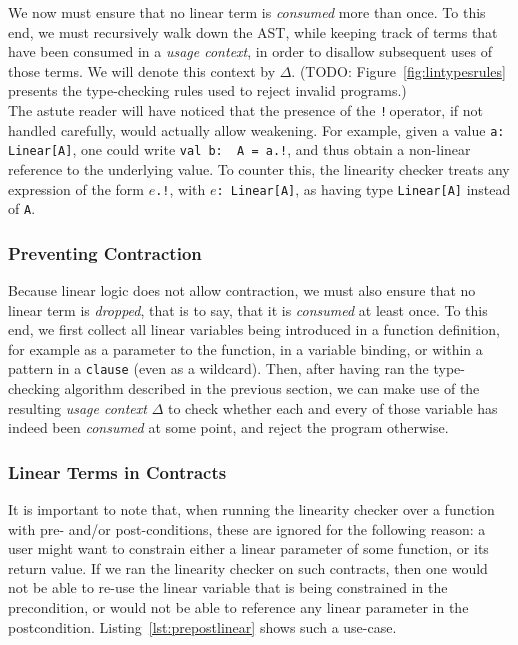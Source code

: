 \documentclass[a4paper,twoside]{article}
\newcommand{\TODO}[1]{\textcolor{YellowOrange}{(TODO: #1)}} %
\newcommand{\RefFig}[1]{Figure~\ref{#1}}
\newcommand{\RefCode}[1]{Listing~\ref{#1}}
\newcommand{\stt}[1]{\texttt{\small{#1}}}
\begin{document}
We now must ensure that no linear term is \textit{consumed} more than once. To this end, we must recursively walk down the AST, while keeping track of terms that have been consumed in a \textit{usage context}, in order to disallow subsequent uses of those terms. We will denote this context by $\Delta$. \TODO{\RefFig{fig:lintypesrules} presents the type-checking rules used to reject invalid programs.}\\

The astute reader will have noticed that the presence of the \stt{!}\,operator, if not handled carefully, would actually allow weakening. For example, given a value \stt{a:\,Linear[A]}, one could write \stt{val b:\, A = a.!}, and thus obtain a non-linear reference to the underlying value. To counter this, the linearity checker treats any expression of the form \stt{$e$.!}, with \stt{$e$:\,Linear[A]}, as having type \stt{Linear[A]} instead of \stt{A}.

\subsubsection*{Preventing Contraction}

Because linear logic does not allow contraction, we must also ensure that no linear term is \textit{dropped}, that is to say, that it is \textit{consumed} at least once. To this end, we first collect all linear variables being introduced in a function definition, for example as a parameter to the function, in a variable binding, or within a pattern in a \texttt{clause} (even as a wildcard). Then, after having ran the type-checking algorithm described in the previous section, we can make use of the resulting \textit{usage context} $\Delta$ to check whether each and every of those variable has indeed been \textit{consumed} at some point, and reject the program otherwise.

\subsubsection*{Linear Terms in Contracts}

It is important to note that, when running the linearity checker over a function with pre- and/or post-conditions, these are ignored for the following reason: a user might want to constrain either a linear parameter of some function, or its return value. If we ran the linearity checker on such contracts, then one would not be able to re-use the linear variable that is being constrained in the precondition, or would not be able to reference any linear parameter in the postcondition. \RefCode{lst:prepostlinear} shows such a use-case.
\end{document}
